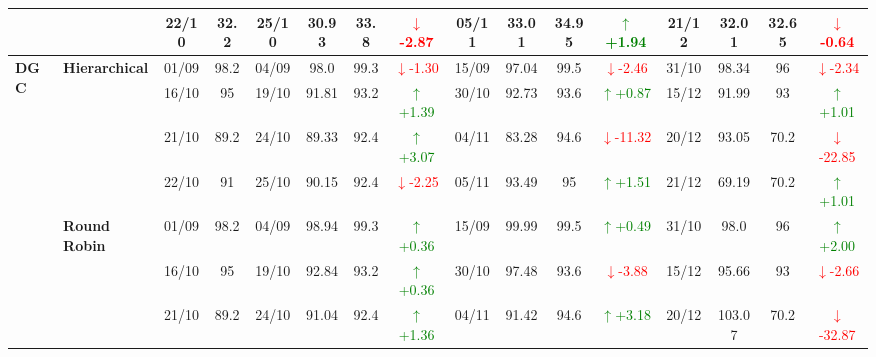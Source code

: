 \documentclass{ieeeaccess}
\begin{document}
{\begin{longtable}{llcc|cccc|cccc|cccc}
&
& 22/10 & 32.2 & 25/10 & 30.93 & 33.8 & \textcolor{red}{\(\downarrow\)-2.87} & 05/11 & 33.01 & 34.95 & \textcolor{green}{\(\uparrow\)+1.94} & 21/12 & 32.01 & 32.65 & \textcolor{red}{\(\downarrow\)-0.64} \\
\midrule




\multirow{12}{*}{\textbf{DGC}} 
& \textbf{Hierarchical}
& 01/09 & 98.2 & 04/09 & 98.0 & 99.3 & \textcolor{red}{\(\downarrow\)-1.30} & 15/09 & 97.04 & 99.5 & \textcolor{red}{\(\downarrow\)-2.46} & 31/10 & 98.34 & 96 & \textcolor{red}{\(\downarrow\)-2.34} \\

&
& 16/10 & 95 & 19/10 & 91.81 & 93.2 & \textcolor{green}{\(\uparrow\)+1.39} & 30/10 & 92.73 & 93.6 & \textcolor{green}{\(\uparrow\)+0.87} & 15/12 & 91.99 & 93 & \textcolor{green}{\(\uparrow\)+1.01} \\

&
& 21/10 & 89.2 & 24/10 & 89.33 & 92.4 & \textcolor{green}{\(\uparrow\)+3.07} & 04/11 & 83.28 & 94.6 & \textcolor{red}{\(\downarrow\)-11.32} & 20/12 & 93.05 & 70.2 & \textcolor{red}{\(\downarrow\)-22.85} \\

&
& 22/10 & 91 & 25/10 & 90.15 & 92.4 & \textcolor{red}{\(\downarrow\)-2.25} & 05/11 & 93.49 & 95 & \textcolor{green}{\(\uparrow\)+1.51} & 21/12 & 69.19 & 70.2 & \textcolor{green}{\(\uparrow\)+1.01} \\
\cmidrule(lr){2-16}


& \textbf{Round Robin}
& 01/09 & 98.2 & 04/09 & 98.94 & 99.3 & \textcolor{green}{\(\uparrow\)+0.36} & 15/09 & 99.99 & 99.5 & \textcolor{green}{\(\uparrow\)+0.49} & 31/10 & 98.0 & 96 & \textcolor{green}{\(\uparrow\)+2.00} \\

&
& 16/10 & 95 & 19/10 & 92.84 & 93.2 & \textcolor{green}{\(\uparrow\)+0.36} & 30/10 & 97.48 & 93.6 & \textcolor{red}{\(\downarrow\)-3.88} & 15/12 & 95.66 & 93 & \textcolor{red}{\(\downarrow\)-2.66} \\

&
& 21/10 & 89.2 & 24/10 & 91.04 & 92.4 & \textcolor{green}{\(\uparrow\)+1.36} & 04/11 & 91.42 & 94.6 & \textcolor{green}{\(\uparrow\)+3.18} & 20/12 & 103.07 & 70.2 & \textcolor{red}{\(\downarrow\)-32.87} \\


\end{longtable}}
\end{document}

